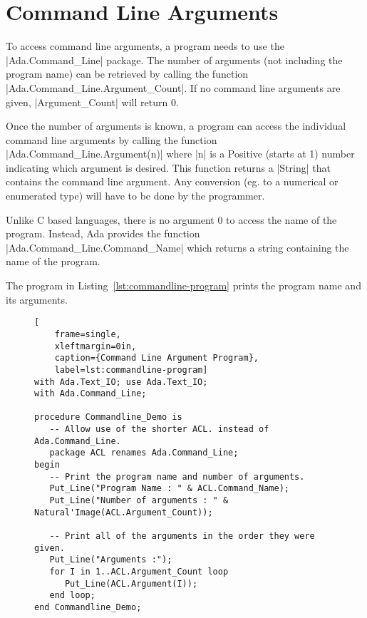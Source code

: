 \section{Command Line Arguments}

To access command line arguments, a program needs to use the |Ada.Command_Line| package. The
number of arguments (not including the program name) can be retrieved by calling the function
|Ada.Command_Line.Argument_Count|. If no command line arguments are given, |Argument_Count| will
return 0.

Once the number of arguments is known, a program can access the individual command line
arguments by calling the function |Ada.Command_Line.Argument(n)| where |n| is a Positive (starts
at 1) number indicating which argument is desired. This function returns a |String| that
contains the command line argument. Any conversion (eg. to a numerical or enumerated type) will
have to be done by the programmer.

Unlike C based languages, there is no argument 0 to access the name of the program. Instead, Ada
provides the function |Ada.Command_Line.Command_Name| which returns a string containing the name
of the program.

The program in Listing~\ref{lst:commandline-program}  prints the program name and its arguments.

\begin{figure}[tbhp]
\begin{lstlisting}[
    frame=single,
    xleftmargin=0in,
    caption={Command Line Argument Program},
    label=lst:commandline-program]
with Ada.Text_IO; use Ada.Text_IO;
with Ada.Command_Line;

procedure Commandline_Demo is
   -- Allow use of the shorter ACL. instead of Ada.Command_Line.
   package ACL renames Ada.Command_Line;
begin
   -- Print the program name and number of arguments.
   Put_Line("Program Name : " & ACL.Command_Name);
   Put_Line("Number of arguments : " & Natural'Image(ACL.Argument_Count));

   -- Print all of the arguments in the order they were given.
   Put_Line("Arguments :");
   for I in 1..ACL.Argument_Count loop
      Put_Line(ACL.Argument(I));
   end loop;
end Commandline_Demo;
\end{lstlisting}
\end{figure}

